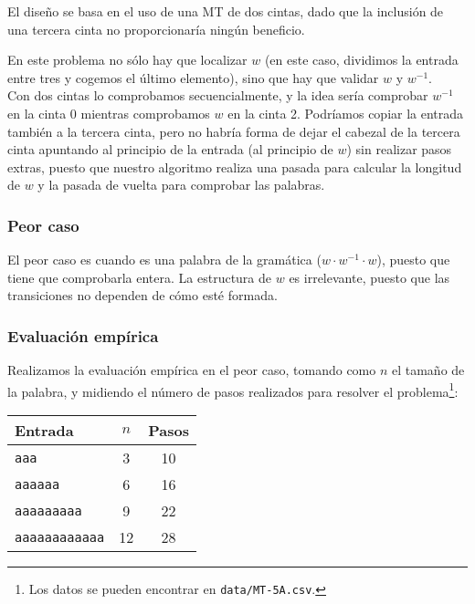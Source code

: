 

El diseño se basa en el uso de una MT de dos cintas, dado que la inclusión de una tercera cinta no proporcionaría ningún beneficio.

En este problema no sólo hay que localizar $w$ (en este caso, dividimos la entrada entre tres y cogemos el último elemento), sino que hay que validar $w$ y $w^{-1}$.\\
Con dos cintas lo comprobamos secuencialmente, y la idea sería comprobar $w^{-1}$ en la cinta 0 mientras comprobamos $w$ en la cinta 2.
Podríamos copiar la entrada también a la tercera cinta, pero no habría forma de dejar el cabezal de la tercera cinta apuntando al principio de la entrada (al principio de $w$) sin realizar pasos extras, puesto que nuestro algoritmo realiza una pasada para calcular la longitud de $w$ y la pasada de vuelta para comprobar las palabras.


\subsubsection*{Peor caso}
El peor caso es cuando es una palabra de la gramática ($w \cdot w^{-1} \cdot w$), puesto que tiene que comprobarla entera. La estructura de $w$ es irrelevante, puesto que las transiciones no dependen de cómo esté formada.

\subsubsection*{Evaluación empírica}
Realizamos la evaluación empírica en el peor caso, tomando como $n$ el tamaño de la palabra, y midiendo el número de pasos realizados para resolver el problema\footnote{Los datos se pueden encontrar en \texttt{data/MT-5A.csv}.}:

\begin{table}[h]
    \centering
    \begin{tabular}{lcc}
        Entrada & $n$ & Pasos \\
        \hline
        \texttt{aaa}                &  3  & 10 \\
        \texttt{aaaaaa}             &  6  & 16 \\
        \texttt{aaaaaaaaa}          &  9  & 22 \\
        \texttt{aaaaaaaaaaaa}       & 12  & 28 \\
    \end{tabular}
\end{table}

